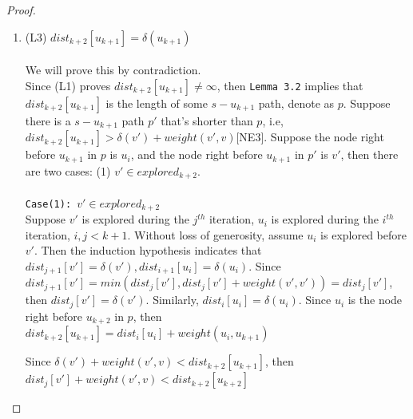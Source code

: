 \documentclass[11pt, oneside]{article}   	%
\theoremstyle{definition}
\begin{document}
\begin{proof}
\begin{itemize}
\begin{enumerate}
  \item (L3) $dist_{k+2}[u_{k+1}] = \delta(u_{k+1})$
  \\\\
  We will prove this by contradiction. 
  \\
  Since (L1) proves $dist_{k+2}[u_{k+1}] \neq \infty$, then \texttt{Lemma 3.2} implies that $dist_{k+2}[u_{k+1}]$ is the length of some $s-u_{k+1}$ path, denote as $p$. Suppose there is a $s-u_{k+1}$ path $p'$ that's shorter than $p$, i.e, $dist_{k+2}[u_{k+1}] > \delta(v') + weight(v', v)$[NE3]. Suppose the node right before $u_{k+1}$  in $p$ is $u_i$, and the node right before $u_{k+1}$ in $p'$ is $v'$, then there are two cases: (1) $v' \in explored_{k+2}$. 
  \\\\
  \texttt{Case(1): $v' \in explored_{k+2}$}
  \\
  Suppose $v'$ is explored during the $j^{th}$ iteration, $u_i$ is explored during the $i^{th}$ iteration, $i, j < k+1$. Without loss of generosity, assume $u_i$ is explored before $v'$. Then the induction hypothesis indicates that $dist_{j+1}[v'] = \delta(v'), dist_{i+1}[u_i] = \delta(u_i)$. Since $dist_{j+1}[v'] = min(dist_j[v'], dist_j[v'] + weight(v', v')) = dist_j[v']$, then $dist_j[v'] = \delta(v')$. Similarly, $dist_i[u_i] = \delta(u_i)$. Since $u_i$ is the node right before $u_{k+2}$ in $p$, then $dist_{k+2}[u_{k+1}] = dist_i[u_i] + weight(u_i, u_{k+1})$


  Since $\delta(v') + weight(v', v) < dist_{k+2}[u_{k+1}]$, then $dist_j[v'] + weight(v', v) < dist_{k+2}[u_{k+2}]$



\end{enumerate}
\end{itemize}
\end{proof}
\end{document}
